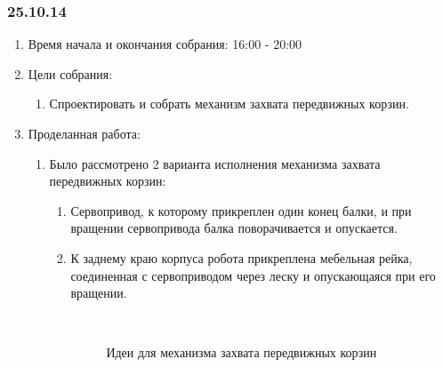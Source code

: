 
\subsubsection{25.10.14}

\begin{enumerate}
	\item Время начала и окончания собрания:
	16:00 - 20:00
	\item Цели собрания:
	\begin{enumerate}
	  \item Спроектировать и собрать механизм захвата передвижных корзин.
	  
    \end{enumerate}
    
	\item Проделанная работа:
	\begin{enumerate}
	  \item Было рассмотрено 2 варианта исполнения механизма захвата передвижных корзин:
	  \begin{enumerate}
	    \item Сервопривод, к которому прикреплен один конец балки, и при вращении сервопривода балка поворачивается и опускается.
	    
	    \item К заднему краю корпуса робота прикреплена мебельная рейка, соединенная с сервоприводом через леску и опускающаяся при его вращении.
	    
	    \begin{figure}[H]
	    	\begin{minipage}[h]{0.2\linewidth}
	    		\center   
	    	\end{minipage}
	    	\begin{minipage}[h]{0.6\linewidth}
	    		\caption{Идеи для механизма захвата передвижных корзин}
	    	\end{minipage}
	    \end{figure}
	    

\end{enumerate}
\end{enumerate}
\end{enumerate}

